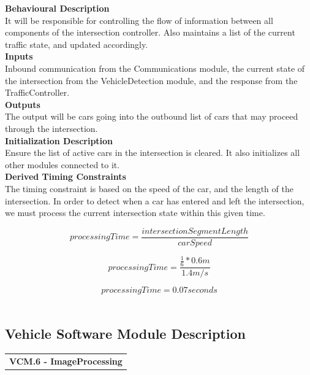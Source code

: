 \documentclass [10pt]{article}
\newcommand{\carSpeed}{1.4 m/s}
\newcommand{\intersectionLength}{0.6m}
\begin{document}
\textbf{Behavioural Description} \\
    It will be responsible for controlling the flow of information between all components of the intersection controller. Also maintains a list of the current traffic state, and updated accordingly. \\
    
\textbf{Inputs} \\
    Inbound communication from the Communications module, the current state of the intersection from the VehicleDetection module, and the response from the TrafficController. \\

\textbf{Outputs} \\
    The output will be cars going into the outbound list of cars that may proceed through the intersection. \\

\textbf{Initialization Description} \\
    Ensure the list of active cars in the intersection is cleared. It also initializes all other modules connected to it. \\

\textbf{Derived Timing Constraints} \\

The timing constraint is based on the speed of the car, and the length of the intersection. In order to detect when a car has entered and left the intersection, we must process the current intersection state within this given time.
    
    

    $$ processingTime = \frac{intersection Segment Length}{carSpeed}  $$
    
    $$ processingTime = \frac{ \frac{1}{6} * \intersectionLength }{\carSpeed}$$
    
    $$ processingTime = 0.07 seconds$$ \\




\subsection{Vehicle Software Module Description}


\begin{longtable}{p{}}
\rowcolor{tableCell}\textbf{VCM.6 - ImageProcessing} \\
\end{longtable}
\end{document}
